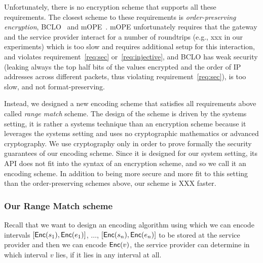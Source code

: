  

Unfortunately, there is no encryption scheme that supports all these requirements. The closest scheme to these requirements  is {\em order-preserving encryption}, BCLO~\cite{boldyreva:ope} and mOPE~\cite{popa:mope}. mOPE unfortunately requires that the gateway and the service provider interact for a number of roundtrips (e.g., xxx in our experiments) which is too slow and requires additional setup for this interaction, and violates requirement~\ref{req:sec} or~\ref{req:injective}, and BCLO has weak security (leaking always the top half bits of the values encrypted and the order of IP addresses across different packets, thus violating requirement~\ref{req:sec}), is too slow, and not format-preserving. 

Instead, we designed a new encoding scheme that satisfies all requirements above called {\em range match} scheme. 
The design of the scheme is driven by the systems setting, it is rather a systems technique than an encryption scheme because it leverages the systems setting and uses no cryptographic mathematics or advanced cryptography.  We use cryptography only in order to prove formally the security guarantees of our encoding scheme. Since it is designed for our system setting, its API does not fit into the syntax of an encryption scheme, and so we call it an encoding scheme. 
In addition to being more secure and more fit to this setting than the order-preserving schemes above, our scheme is XXX faster.



\subsubsection{Our Range Match scheme} 


Recall that we want to design an encoding algorithm using which we can encode intervals  $[\mathsf{Enc}(s_1), \mathsf{Enc}(e_1)]$, $\dots$, $[\mathsf{Enc}(s_n), \mathsf{Enc}(e_n)]$ to be stored at the service provider and then we can encode  $\mathsf{Enc}(v)$, the service provider can determine in which interval $v$ lies, if it lies in any interval at all. 

